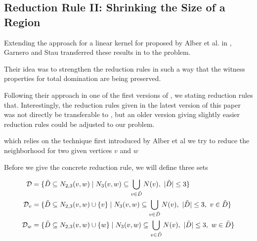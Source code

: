 
\subsection{Reduction Rule II: Shrinking the Size of a Region}


Extending the approach for a linear kernel for \dom proposed by Alber et al. in \cite{Alber2004}, Garnero and Stau transferred these results in \cite{Garnero2018} to the \tdom problem. 

Their idea was to strengthen the reduction rules in such a way that the witness properties for total domination are being preserved.

Following their approach in one of the first versions of \cite{Garnero2014}, we stating reduction rules that. Interestingly, the reduction rules given in the latest version of this paper was not directly be transferable to \sdom, but an older version giving slightly easier reduction rules could be adjusted to our problem.

which relies on the technique first introduced by Alber et al we try to reduce the neighborhood for two given vertices $v$ and $w$

Before we give the concrete reduction rule, we will define three sets 

\begin{align}
    \mathcal{D} &= \{ \tilde D \subseteq N_{2,3}(v,w)            \mid N_3(v,w) \subseteq \bigcup_{v \in \tilde D} N(v),\ |\tilde D| \leq 3                  \}\\
    \mathcal{D}_{v}  &= \{ \tilde D \subseteq N_{2,3}(v,w) \cup \{v\} \mid N_3(v,w) \subseteq \bigcup_{v \in \tilde D} N(v),\ |\tilde D| \leq 3,\ v \in \tilde D \}\\
    \mathcal{D}_{w}  &= \{ \tilde D \subseteq N_{2,3}(v,w) \cup \{w\} \mid N_3(v,w) \subseteq \bigcup_{v \in \tilde D} N(v),\ |\tilde D| \leq 3,\ w \in \tilde D \}
    \end{align}


